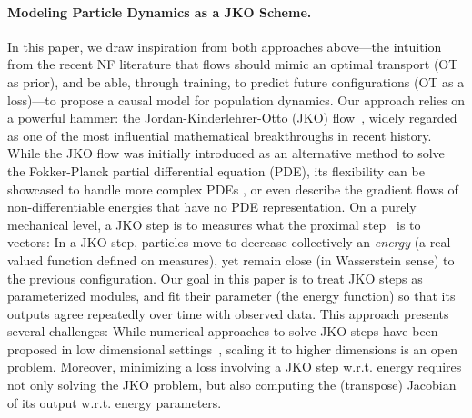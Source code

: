 \paragraph{Modeling Particle Dynamics as a JKO Scheme.} In this paper, we draw inspiration from both approaches above---the intuition from the recent NF literature that flows should mimic an optimal transport (OT as prior), and be able, through training, to predict future configurations (OT as a loss)---to propose a causal model for population dynamics. Our approach relies on a powerful hammer: the Jordan-Kinderlehrer-Otto (JKO) flow~\citep{jordan1998variational}, widely regarded as one of the most influential mathematical breakthroughs in recent history. While the JKO flow was initially introduced as an alternative method to solve the Fokker-Planck partial differential equation (PDE), its flexibility can be showcased to handle more complex PDEs \cite[\S4.7]{santambrogio2017euclidean}, or even describe the gradient flows of non-differentiable energies that have no PDE representation.
On a purely mechanical level, a JKO step is to measures what the proximal step~\citep{combettes2011proximal} is to vectors: In a JKO step, particles move to decrease collectively an {\em energy} (a real-valued function defined on measures), yet remain close (in Wasserstein sense) to the previous configuration. Our goal in this paper is to treat JKO steps as parameterized modules, and fit their parameter (the energy function) so that its outputs agree repeatedly over time with observed data. 
This approach presents several challenges: While numerical approaches to solve JKO steps have been proposed in low dimensional settings~\citep{burger2010, carrillo2021primal, 2015-Peyre-siims,benamou2016augmented}, scaling it to higher dimensions is an open problem. Moreover, minimizing a loss involving a JKO step w.r.t. energy requires not only solving the JKO problem, but also computing the (transpose) Jacobian of its output w.r.t. energy parameters.


